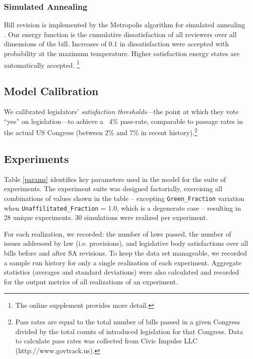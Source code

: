 \documentclass[pdftex,12pt,oribibl]{llncs}
\begin{document}
\subsubsection{Simulated Annealing}
Bill revision is implemented by the Metropolis algorithm for simulated annealing \parencite{mrrt53, kgv}.
Our energy function is the cumulative dissatisfaction of all reviewers over all dimensions of the bill. Increases of $0.1$ in dissatisfaction were accepted with probability  at the maximum temperature.
Higher satisfaction energy states are automatically accepted.
\footnote{The online supplement provides more detail.}
\subsection{Model Calibration}
We calibrated legislators' \textit{satisfaction thresholds}---the point at which they vote ``yes'' on legislation---to achieve a ~4\% pass-rate, comparable to passage rates in the actual US Congress (between 2\% and 7\% in recent history).\footnote{Pass rates are equal to the total number of bills passed in a given Congress divided by the total counts of introduced legislation for that Congress. Data to calculate pass rates was collected from Civic Impulse LLC (http://www.govtrack.us).\label{passfn}}
\subsection{Experiments}
Table \ref{params} identifies key parameters used in the model for the suite of experiments.
The experiment suite was designed factorially, exercising all combinations of values shown in the table -- excepting \texttt{Green\_Fraction} variation when {\texttt{Unaffilitated\_Fraction} = 1.0}, which is a degenerate case -- resulting in 28 unique experiments.
30 simulations were realized per experiment.

For each realization, we recorded: the number of laws passed, the number of issues addressed by law (i.e. provisions), and legislative body satisfactions over all bills before and after SA revisions. 
To keep the data set manageable, we recorded a sample run history for only a single realization of each experiment.
Aggregate statistics (averages and standard deviations) were also calculated and recorded for the output metrics of all realizations of an experiment.
\end{document}
